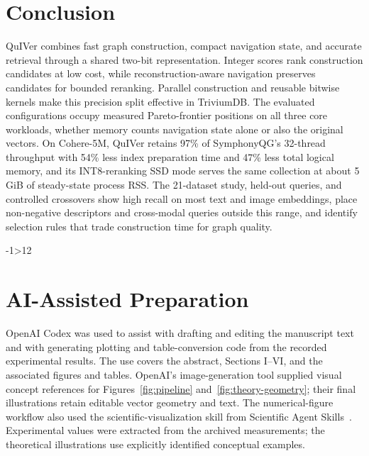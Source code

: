 \section{Conclusion}
QuIVer combines fast graph construction, compact navigation state, and accurate retrieval through a shared two-bit representation. Integer scores rank construction candidates at low cost, while reconstruction-aware navigation preserves candidates for bounded reranking. Parallel construction and reusable bitwise kernels make this precision split effective in TriviumDB. The evaluated configurations occupy measured Pareto-frontier positions on all three core workloads, whether memory counts navigation state alone or also the original vectors. On Cohere-5M, QuIVer retains 97\% of SymphonyQG's 32-thread throughput with 54\% less index preparation time and 47\% less total logical memory, and its INT8-reranking SSD mode serves the same collection at about 5 GiB of steady-state process RSS. The 21-dataset study, held-out queries, and controlled crossovers show high recall on most text and image embeddings, place non-negative descriptors and cross-modal queries outside this range, and identify selection rules that trade construction time for graph quality.

\clearpage
\ifnum\numexpr\value{page}-1\relax>12
  \xdef\quiverLayoutIssues{\quiverLayoutIssues\space 正文页数=\number\numexpr\value{page}-1\relax\space（上限12）；}
\fi
\section*{AI-Assisted Preparation}
OpenAI Codex was used to assist with drafting and editing the manuscript text and with generating plotting and table-conversion code from the recorded experimental results. The use covers the abstract, Sections I--VI, and the associated figures and tables. OpenAI's image-generation tool supplied visual concept references for Figures~\ref{fig:pipeline} and~\ref{fig:theory-geometry}; their final illustrations retain editable vector geometry and text. The numerical-figure workflow also used the scientific-visualization skill from Scientific Agent Skills~\cite{kassis2026skills}. Experimental values were extracted from the archived measurements; the theoretical illustrations use explicitly identified conceptual examples.
